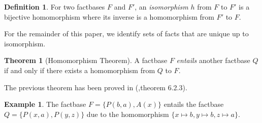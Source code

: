 \documentclass{article}
\theoremstyle{definition}
\newtheorem{definition}{Definition}[section]
\newtheorem{theorem}{Theorem}[section]
\newtheorem{example}{Example}[section]
\theoremstyle{remark}
\newtheorem{remark}{Remark}[section]
\begin{document}
\begin{definition}
For two factbases $F$ and $F'$, an \emph{isomorphism} $h$ from $F$ to $F'$ is a bijective homomorphism where its inverse is a homomorphism from $F'$ to $F$. 
\end{definition}

For the remainder of this paper, we identify sets of facts that are unique up to isomorphism.




\begin{theorem}[Homomorphism Theorem] \label{hom_thm}
A factbase $F$ \emph{entails} another factbase $Q$ if and only if there exists a homomorphism from $Q$ to $F$.
\end{theorem}

The previous theorem has been proved in (\cite{base},theorem 6.2.3).

\begin{example}
The factbase $F = \{P(b,a),A(x)\}$ entails the factbase $Q = \{P(x,a),P(y,z)\}$ due to the homomorphism $\{x \mapsto b, y \mapsto b, z \mapsto a \}$.
\end{example}
\end{document}

